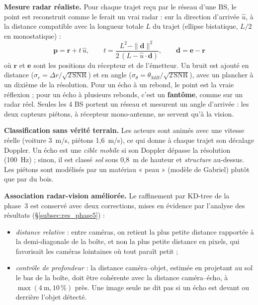 \documentclass[12pt,a4paper,titlepage]{article}
\begin{document}
\textbf{Mesure radar réaliste.} Pour chaque trajet reçu par le réseau d'une BS, le point est reconstruit comme le ferait un vrai radar : sur la direction d'arrivée $\hat{u}$, à la distance compatible avec la longueur totale $L$ du trajet (ellipse bistatique, $L/2$ en monostatique) :
\begin{equation}
    \mathbf{p} = \mathbf{r} + t\,\hat{u}, \qquad t = \frac{L^2 - \|\mathbf{d}\|^2}{2\,(L - \hat{u}\cdot\mathbf{d})}, \qquad \mathbf{d} = \mathbf{e} - \mathbf{r}
    \label{eq:point_apparent}
\end{equation}
où $\mathbf{r}$ et $\mathbf{e}$ sont les positions du récepteur et de l'émetteur. Un bruit est ajouté en distance ($\sigma_r = \Delta r/\sqrt{2\,\mathrm{SNR}}$) et en angle ($\sigma_\theta = \theta_{3dB}/\sqrt{2\,\mathrm{SNR}}$), avec un plancher à un dixième de la résolution. Pour un écho à un rebond, le point est la vraie réflexion ; pour un écho à plusieurs rebonds, c'est un \textbf{fantôme}, comme sur un radar réel. Seules les 4 BS portent un réseau et mesurent un angle d'arrivée : les deux capteurs piétons, à récepteur mono-antenne, ne servent qu'à la vision.

\textbf{Classification sans vérité terrain.} Les acteurs sont animés avec une vitesse réelle (voiture 3~m/s, piétons 1,6~m/s), ce qui donne à chaque trajet son décalage Doppler. Un écho est une \emph{cible mobile} si son Doppler dépasse la résolution (100~Hz) ; sinon, il est classé \emph{sol} sous 0,8~m de hauteur et \emph{structure} au-dessus. Les piétons sont modélisés par un matériau « peau » (modèle de Gabriel) plutôt que par du bois.

\textbf{Association radar-vision améliorée.} Le raffinement par KD-tree de la phase~3 est conservé avec deux corrections, mises en évidence par l'analyse des résultats (\S\ref{subsec:res_phase5}) :
\begin{itemize}[leftmargin=1.5em]
    \item \emph{distance relative} : entre caméras, on retient la plus petite distance rapportée à la demi-diagonale de la boîte, et non la plus petite distance en pixels, qui favorisait les caméras lointaines où tout paraît petit ;
    \item \emph{contrôle de profondeur} : la distance caméra--objet, estimée en projetant au sol le bas de la boîte, doit être cohérente avec la distance caméra--écho, à $\max(4~\text{m}, 10\,\%)$ près. Une image seule ne dit pas si un écho est devant ou derrière l'objet détecté.
\end{itemize}
\end{document}
